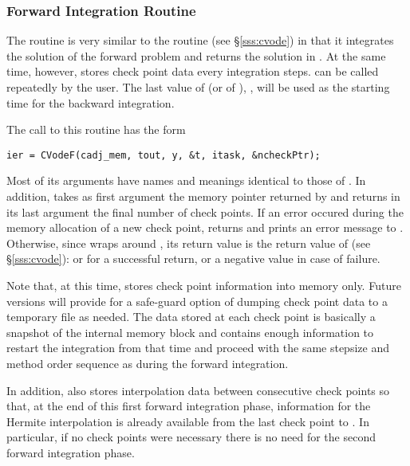 \subsubsection{Forward Integration Routine}\label{sss:cvodef}

The routine  is very similar to the {\cvodes} routine 
(see \S\ref{sss:cvode}) in that it integrates the solution of the forward
problem and returns the solution in . At the same time,
however,  stores check point data every  integration steps.
 can be called repeatedly by the user. The last value of  
(or of ), , will be used as the starting time for the backward 
integration.

The call to this routine has the form
\begin{verbatim}
ier = CVodeF(cadj_mem, tout, y, &t, itask, &ncheckPtr);
\end{verbatim}
Most of its arguments have names and meanings identical to those of .
In addition,  takes as first argument the memory pointer 
returned by  and returns in its last argument the final number of 
check points. If an error occured during the memory allocation of a new check
point,  returns  and prints an error message to 
. Otherwise, since  wraps around , its return 
value  is the return value of  (see \S\ref{sss:cvode}): 
 or  for a successful return, 
or a negative value in case of failure.

Note that, at this time,  stores check point information into memory
only. Future versions will provide for a safe-guard option of dumping check point
data to a temporary file as needed. The data stored at each check point is basically
a snapshot of the {\cvodes} internal memory block and contains enough information
to restart the integration from that time and proceed with the same stepsize and
method order sequence as during the forward integration.

In addition,  also stores interpolation data between consecutive check points
so that, at the end of this first forward integration phase, information for the Hermite 
interpolation is already available from the last check point to . In particular,
if no check points were necessary there is no need for the second forward integration phase.

